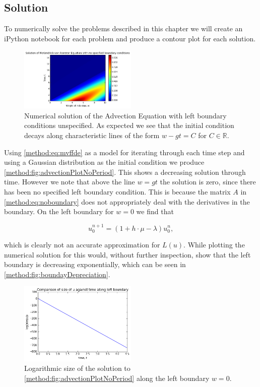 \documentclass[../main.tex]{subfiles}
\begin{document}
  \subsection{Solution}
  To numerically solve the problems described in this chapter we will create an iPython notebook for each problem and produce a contour plot for each solution.

  \begin{figure}[htb]
    \centering
    \includegraphics[width=0.5\textwidth]{_assets/advection_noPeriod.png}
    \caption{\label{method:fig:advectionPlotNoPeriod} Numerical solution of the Advection Equation with left boundary conditions unspecified. As expected we see that the initial condition decays along characteristic lines of the form $w - g t = C$ for $C \in \mathbb{R}$.}
  \end{figure}

  Using \autoref{method:eq:mvffde} as a model for iterating through each time step and using a Gaussian distribution as the initial condition we produce \autoref{method:fig:advectionPlotNoPeriod}. This shows a decreasing solution through time. However we note that above the line $w = gt$ the solution is zero, since there has been no specified left boundary condition. This is because the matrix $A$ in \autoref{method:eq:noboundary} does not appropriately deal with the derivatives in the boundary. On the left boundary for $w = 0$ we find that

  \begin{equation}
    u^{n+1}_0 = \left( 1 + h \cdot \mu - \lambda \right) u^n_0,
  \end{equation}

  which is clearly not an accurate approximation for $L(u)$. While plotting the numerical solution for this would, without further inspection, show that the left boundary is decreasing exponentially, which can be seen in \autoref{method:fig:boundayDepreciation}.

  \begin{figure}[htb]
    \centering
    \includegraphics[width=0.5\textwidth]{_assets/uBoundary.png}
    \caption{\label{method:fig:boundayDepreciation} Logarithmic size of the solution to \autoref{method:fig:advectionPlotNoPeriod} along the left boundary $w = 0$.}
  \end{figure}
\end{document}
